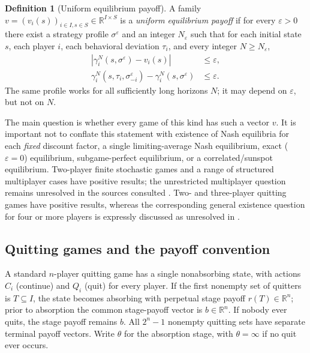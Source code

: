 \documentclass[11pt,a4paper]{article}
\theoremstyle{definition}
\newtheorem{definition}[theorem]{Definition}
\theoremstyle{remark}
\newcommand{\R}{\mathbb{R}}
\begin{document}
\begin{definition}[Uniform equilibrium payoff]\label{def:uniform}
A family $v=(v_i(s))_{i\in I,s\in S}\in\R^{I\times S}$ is a \emph{uniform equilibrium payoff} if for every $\varepsilon>0$ there exist a strategy profile $\sigma^\varepsilon$ and an integer $N_\varepsilon$ such that for each initial state $s$, each player $i$, each behavioral deviation $\tau_i$, and every integer $N\ge N_\varepsilon$,
\begin{align}
\left|\gamma_i^N(s,\sigma^\varepsilon)-v_i(s)\right|&\le\varepsilon,\label{eq:uniform-payoff}\\
\gamma_i^N(s,\tau_i,\sigma^\varepsilon_{-i})-\gamma_i^N(s,\sigma^\varepsilon)&\le\varepsilon.\label{eq:uniform-incentive}
\end{align}
The same profile works for all sufficiently long horizons $N$; it may depend on $\varepsilon$, but not on $N$.
\end{definition}

The main question is whether every game of this kind has such a vector $v$. It is important not to conflate this statement with existence of Nash equilibria for each \emph{fixed} discount factor, a single limiting-average Nash equilibrium, exact ($\varepsilon=0$) equilibrium, subgame-perfect equilibrium, or a correlated/sunspot equilibrium. Two-player finite stochastic games and a range of structured multiplayer cases have positive results; the unrestricted multiplayer question remains unresolved in the sources consulted \cite{sv2001,akrs2024,aps2026,sv2025}. Two- and three-player quitting games have positive results, whereas the corresponding general existence question for four or more players is expressly discussed as unresolved in \cite{aps2026}.

\subsection{Quitting games and the payoff convention}\label{sec:quitting}
A standard $n$-player quitting game has a single nonabsorbing state, with actions $C_i$ (continue) and $Q_i$ (quit) for every player. If the first nonempty set of quitters is $T\subseteq I$, the state becomes absorbing with perpetual stage payoff $r(T)\in\R^n$; prior to absorption the common stage-payoff vector is $b\in\R^n$. If nobody ever quits, the stage payoff remains $b$. All $2^n-1$ nonempty quitting sets have separate terminal payoff vectors. Write $\theta$ for the absorption stage, with $\theta=\infty$ if no quit ever occurs.
\end{document}

